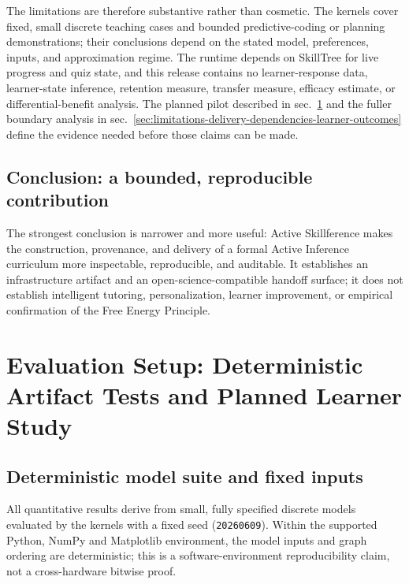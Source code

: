 \documentclass[
  english,
]{article}
\begin{document}
The limitations are therefore substantive rather than cosmetic. The
kernels cover fixed, small discrete teaching cases and bounded
predictive-coding or planning demonstrations; their conclusions depend
on the stated model, preferences, inputs, and approximation regime. The
runtime depends on SkillTree for live progress and quiz state, and this
release contains no learner-response data, learner-state inference,
retention measure, transfer measure, efficacy estimate, or
differential-benefit analysis. The planned pilot described in
sec.~\ref{sec:evaluation-setup-deterministic-tests-learner-study} and
the fuller boundary analysis in
sec.~\ref{sec:limitations-delivery-dependencies-learner-outcomes} define
the evidence needed before those claims can be made.

\subsection{Conclusion: a bounded, reproducible
contribution}\label{conclusion-a-bounded-reproducible-contribution}

The strongest conclusion is narrower and more useful: Active
Skillference makes the construction, provenance, and delivery of a
formal Active Inference curriculum more inspectable, reproducible, and
auditable. It establishes an infrastructure artifact and an
open-science-compatible handoff surface; it does not establish
intelligent tutoring, personalization, learner improvement, or empirical
confirmation of the Free Energy Principle.

\newpage

\section{Evaluation Setup: Deterministic Artifact Tests and Planned
Learner
Study}\label{sec:evaluation-setup-deterministic-tests-learner-study}

\subsection{Deterministic model suite and fixed
inputs}\label{deterministic-model-suite-and-fixed-inputs}

All quantitative results derive from small, fully specified discrete
models evaluated by the kernels with a fixed seed (\texttt{20260609}).
Within the supported Python, NumPy and Matplotlib environment, the model
inputs and graph ordering are deterministic; this is a
software-environment reproducibility claim, not a cross-hardware bitwise
proof.
\end{document}
